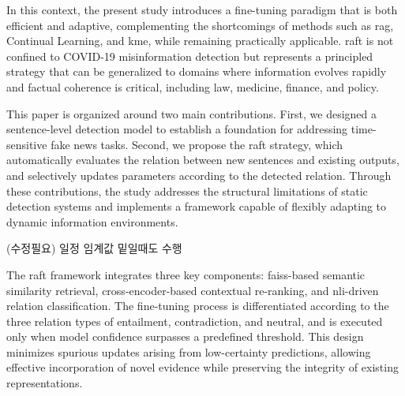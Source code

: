 \documentclass[a4paper,fleqn]{cas-sc}
\begin{document}
In this context, the present study introduces a fine-tuning paradigm that is both efficient and adaptive, complementing the shortcomings of methods such as \gls{rag}, Continual Learning, and \gls{kme}, while remaining practically applicable. \gls{raft} is not confined to COVID-19 misinformation detection but represents a principled strategy that can be generalized to domains where information evolves rapidly and factual coherence is critical, including law, medicine, finance, and policy.

This paper is organized around two main contributions.
First, we designed a sentence-level detection model to establish a foundation for addressing time-sensitive fake news tasks.
Second, we propose the \gls{raft} strategy, which automatically evaluates the relation between new sentences and existing outputs, and selectively updates parameters according to the detected relation. Through these contributions, the study addresses the structural limitations of static detection systems and implements a framework capable of flexibly adapting to dynamic information environments.

(수정필요) 일정 임계값 밑일때도 수행

The \gls{raft} framework integrates three key components: \gls{faiss}-based semantic similarity retrieval, cross-encoder-based contextual re-ranking, and \gls{nli}-driven relation classification. The fine-tuning process is differentiated according to the three relation types of entailment, contradiction, and neutral, and is executed only when model confidence surpasses a predefined threshold. This design minimizes spurious updates arising from low-certainty predictions, allowing effective incorporation of novel evidence while preserving the integrity of existing representations.
\end{document}
